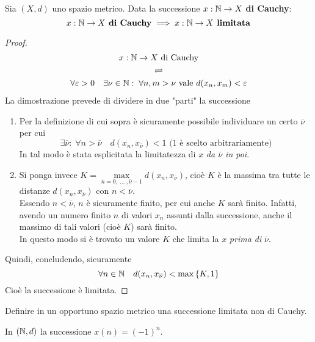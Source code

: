 \begin{proposition}
	\label{prop:se_cau_allora_lim}
	Sia $(X,d)$ uno spazio metrico. Data la successione $x: \mathbb{N} \to X$ \textbf{di Cauchy}:
	\[x: \mathbb{N} \to X \text{\textbf{ di Cauchy}} \implies x: \mathbb{N} \to X \text{\textbf{ limitata}}\]
	\begin{proof}
		\begin{equation*}
			\begin{gathered}
				x: \mathbb{N} \to X \text{ di Cauchy}\\
				\rightleftharpoons\\
				\forall \varepsilon > 0\quad \exists \nu \in \mathbb{N}:\; \forall n,m > \nu \text{ vale } d(x_n, x_m) < \varepsilon
			\end{gathered}
		\end{equation*}
		La dimostrazione prevede di dividere in due "parti" la successione
		\begin{enumerate}
			\item Per la definizione di cui sopra è sicuramente possibile individuare un certo $\overline{\nu}$ per cui
				\[\exists \overline{\nu}:\; \forall n > \overline{\nu} \quad d(x_n, x_{\overline{\nu}}) < 1 \text{ (1 è scelto arbitrariamente)}\]
				In tal modo è stata esplicitata la limitatezza di $x$ \textit{da $\overline{\nu}$ in poi}.
			\item Si ponga invece $K = \max\limits_{n=0,\: \dotsc \:, \overline{\nu}-1} d(x_n, x_{\overline{\nu}})$, cioè $K$ è la massima tra tutte le distanze $d(x_n, x_{\overline{\nu}})$ con $n < \overline{\nu}$.\\
				Essendo $n < \overline{\nu}$, $n$ è sicuramente finito, per cui anche $K$ sarà finito. Infatti, avendo un numero finito $n$ di valori $x_n$ assunti dalla successione, anche il massimo di tali valori (cioè $K$) sarà finito.\\
				In questo modo si è trovato un valore $K$ che limita la $x$ \textit{prima di} $\overline{\nu}$.
		\end{enumerate}
		Quindi, concludendo, sicuramente
		\[\forall n \in \mathbb{N} \quad d(x_n, x_{\overline{\nu}}) < \max \left\{K, 1\right\}\]
		Cioè la successione è limitata.
	\end{proof}
\end{proposition}
\begin{exercise}
	\label{ex:succ_lim_non_cau}
	Definire in un opportuno spazio metrico una successione limitata non di Cauchy.
	\begin{solution}
		In $(\mathbb{N},d)$ la successione $x(n) = (-1)^n$.
	\end{solution}
\end{exercise}
